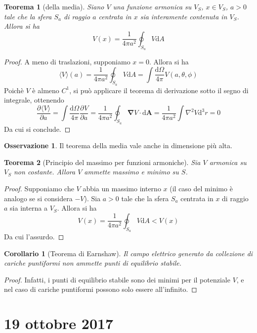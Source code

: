 \documentclass[a4paper,11pt]{book}
\newcommand{\dif}{\mathrm{d}}
\newcommand{\der}[3][]{\frac{\partial ^{#1}#2}{\partial {#3}^{#1}}}
\let\oldnabla\nabla
\renewcommand{\nabla}{\vec{\oldnabla}}
\newcommand{\lap}{\oldnabla^2}
\renewcommand{\vec}[1]{\mathbf{#1}}
\theoremstyle{theorem}
\newtheorem{teorema}{Teorema}[section]
\newtheorem{corollario}{Corollario}[section]
\theoremstyle{definition}
\newtheorem{osservazione}{Osservazione}[section]
\begin{document}
\begin{teorema}[della media]
	Siano $V$ una funzione armonica su $V_S$, $x\in V_S$, $a>0$ tale che la sfera $S_a$ di raggio $a$ centrata in $x$ sia interamente contenuta in $V_S$. Allora si ha
	\[
		V(x)=\frac{1}{4\pi a^2}\oint_{S_a}V\dif A
	\]
\end{teorema} 
\begin{proof}
	A meno di traslazioni, supponiamo $x=0$. Allora si ha
	\[
		\langle V\rangle(a)=\frac{1}{4\pi a^2}\oint_{S_a}V\dif A=\int\frac{\dif\Omega}{4\pi}V(a,\theta,\phi)
	\]
	Poichè $V$ è almeno $C^1$, si può applicare il teorema di derivazione sotto il segno di integrale, ottenendo
	\[\der{\langle V\rangle}{a}=\int\frac{\dif\Omega}{4\pi}\der{V}{a}=\frac{1}{4\pi a^2}\oint_{S_a}\nabla V\cdot\dif\vec{A}=\frac{1}{4\pi a^2}\int\lap V\dif^3r=0\]
	Da cui si conclude.
\end{proof}
\begin{osservazione}
	Il teorema della media vale anche in dimensione più alta.
\end{osservazione}
\begin{teorema}[Principio del massimo per funzioni armoniche]
	Sia $V$ armonica su $V_S$ non costante. Allora $V$ ammette massimo e minimo su $S$.
\end{teorema}
\begin{proof}
	Supponiamo che $V$ abbia un massimo interno $x$ (il caso del minimo è analogo se si considera $-V$). Sia $a>0$ tale che la sfera $S_a$ centrata in $x$ di raggio $a$ sia interna a $V_S$. Allora si ha
	\[
		V(x)=\frac{1}{4\pi a^2}\oint_{S_a}V\dif A<V(x)
	\]
	Da cui l'assurdo.
\end{proof}
\begin{corollario}[Teorema di Earnshaw]
	Il campo elettrico generato da collezione di cariche puntiformi non ammette punti di equilibrio stabile.
\end{corollario}
\begin{proof}
	Infatti, i punti di equilibrio stabile sono dei minimi per il potenziale $V$, e nel caso di cariche puntiformi possono solo essere all'infinito.
\end{proof}
\newpage
\section{19 ottobre 2017}
\end{document}
